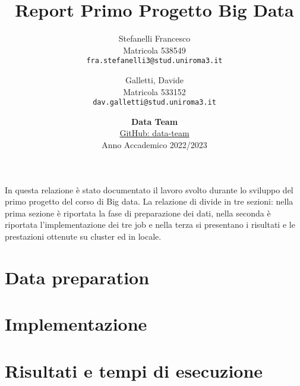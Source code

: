 \documentclass[11pt]{article}
\author{
 Stefanelli Francesco \\
 Matricola 538549\\
 \texttt{fra.stefanelli3@stud.uniroma3.it}
 \and
 Galletti, Davide \\
 Matricola 533152\\
 \texttt{dav.galletti@stud.uniroma3.it}
}
\title{\huge\textbf{Report Primo Progetto Big Data}}
\date{\textbf{Data Team} \\
\href{https://github.com/BD-Data-Team/first-project-bigdata}{GitHub: data-team}\\
Anno Accademico 2022/2023}
\begin{document}
\maketitle
In questa relazione è stato documentato il lavoro svolto durante lo sviluppo del primo progetto del corso di Big data. La relazione di divide in tre sezioni: nella prima sezione è riportata la fase di preparazione dei dati, nella seconda è riportata l'implementazione dei tre job e nella terza si presentano i risultati e le prestazioni ottenute su cluster ed in locale.

\section{Data preparation}


\section{Implementazione}\label{section:1}


\newpage
\section{Risultati e tempi di esecuzione}

\end{document}
